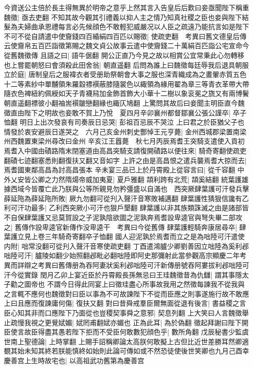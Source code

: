 今資送公主倍於長主得無異於明帝之意乎上然其言入告皇后后歎曰妾亟聞陛下稱重魏徵|{
	亟去吏翻}
不知其故今觀其引禮義以抑人主之情乃知真社稷之臣也妾與陛下結髮為夫婦曲承恩禮每言必先候顔色不敢輕犯威嚴况以人臣之疏遠乃能抗言如是陛下不可不從自請遣中使齎錢四百緍絹四百匹以賜徵|{
	使疏吏翻　考異曰舊文德皇后傳云使齎帛五百匹詣徵第賜之魏文貞公故事云遣中使齎錢二十萬絹百匹詣公宅宣命今從舊魏徵傳}
且語之曰|{
	語牛倨翻}
開公正直乃今見之故以相賞公宜常秉此心勿轉移也上嘗罷朝怒曰會須殺此田舍翁|{
	朝直遥翻}
后問為誰上曰魏徵每廷辱我后退具朝服立於庭|{
	唐制皇后之服褘衣者受册助祭朝會大事之服也深青織成為之畫翬赤質五色十二等素紗中單黼領朱羅縠褾襈蔽膝隨裳色以緅領為緣用翟為章三等青衣革帶大帶隨衣色裨紐約佩綬如天子青襪舄加金飾首飾大小華十二樹以象衮冕之旒又有兩博鬢朝直遥翻褾彼小翻袖耑襈皺戀翻緣也緅仄鳩翻}
上驚問其故后曰妾聞主明臣直今魏徵直由陛下之明故也妾敢不賀上乃悅　夏四月辛卯襄州都督鄒襄公張公謹卒|{
	卒子恤翻}
明日上出次發哀有司奏辰日忌哭|{
	彭祖百忌辰不哭泣}
上曰君之於臣猶父子也情發於衷安避辰日遂哭之　六月己亥金州刺史酆悼王元亨薨|{
	金州西城郡梁置南梁州西魏置東梁州尋改曰金州}
辛亥江王囂薨　秋七月丙辰焉耆王突騎支遣使入貢初焉耆入中國由磧路隋末閉塞道由高昌突騎支請復開磧路以便往來|{
	騎奇寄翻使疏吏翻磧七迹翻塞悉則翻復扶又翻又音如字}
上許之由是高昌恨之遣兵襲焉耆大掠而去|{
	焉耆國東鄰高昌為討高昌張本}
辛未宴三品已上於丹霄殿上從容言曰|{
	從千容翻}
中外乂安皆公卿之力然隋煬帝威加夷夏|{
	夏戶雅翻}
頡利跨有北荒|{
	頡奚結翻}
統葉護雄據西域今皆覆亡此乃朕與公等所親見勿矜彊盛以自滿也　西突厥肆葉護可汗發兵擊薛延陁為薛延陁所敗|{
	厥九勿翻可從刋入聲汗音寒敗補邁翻}
肆葉護性猜狠信讒有乙利可汗功最多|{
	乙利西突厥小可汗也狠戶墾翻}
肆葉護以非其族類誅滅之由是諸部皆不自保肆葉護又忌莫賀設之子泥孰陰欲圖之泥孰奔焉耆設卑逵官與弩失畢二部攻之|{
	舊傳作設卑逵官新傳作没卑逵干　考異曰今從舊傳}
肆葉護輕騎奔康居尋卒|{
	肆葉護立見上卷三年騎奇寄翻卒子恤翻}
國人迎泥孰於焉耆而立之是為咄陸可汗遣使内附|{
	咄常没翻可從刋入聲汗音寒使疏吏翻}
丁酉遣鴻臚少卿劉善因立咄陸為奚利邲咄陸可汗|{
	臚陵如翻少始照翻邲毗必翻咄陸即阿史那彌射此當參觀高宗顯慶二年考異而詳辯之考異曰舊傳册為吞阿妻狀奚利邲咄陸可汗新傳册號吞阿婁拔利邲咄陸可汗今從實錄}
閏月乙卯上宴近臣於丹霄殿長孫無忌曰王珪魏徵昔為仇讎|{
	謂其事隱太子勸之圖帝也}
不謂今日得此同宴上曰徵珪盡心所事故我用之然徵每諫我不從我與之言輒不應何也魏徵對曰臣以事為不可故諫陛下不從而臣應之則事遂施行故不敢應上曰且應而復諫庸何傷|{
	復扶又翻}
對曰昔舜戒羣臣爾無面從退有後言|{
	書益稷之言}
臣心知其非而口應陛下乃面從也豈稷契事舜之意邪|{
	契息列翻}
上大笑曰人言魏徵舉止疏慢我視之更覺娬媚|{
	娬罔甫翻娬亦媚也}
正為此耳|{
	為於偽翻}
徵起拜謝曰陛下開臣使言故臣得盡其愚若陛下拒而不受臣何敢數犯顔色乎|{
	數所角翻}
戊辰秘書少監虞世南上聖德論|{
	上時掌翻}
上賜手詔稱卿論太高朕何敢擬上古但比近世差勝耳然卿適覩其始未知其終若朕能慎終如始則此論可傳如或不然恐徒使後世笑卿也九月己酉幸慶善宫上生時故宅也|{
	以高祖武功舊第為慶善宫}


